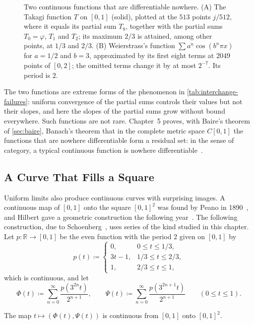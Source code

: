 \begin{figure}
{{\begin{tikzpicture}
\end{tikzpicture}}}{Two continuous functions that are differentiable nowhere. (A) The Takagi function $T$ on $[0,1]$ (solid), plotted at the $513$ points $j/512$, where it equals its partial sum $T_8$, together with the partial sums $T_0=\varphi$, $T_1$ and $T_2$; its maximum $2/3$ is attained, among other points, at $1/3$ and $2/3$. (B) Weierstrass's function $\sum a^n\cos(b^n\pi x)$ for $a=1/2$ and $b=3$, approximated by its first eight terms at $2049$ points of $[0,2]$; the omitted terms change it by at most $2^{-7}$. Its period is $2$.\label{fig:nowhere-differentiable}}
\end{figure}

The two functions are extreme forms of the phenomenon in \cref{tab:interchange-failures}: uniform convergence of the partial sums controls their values but not their slopes, and here the slopes of the partial sums grow without bound everywhere. Such functions are not rare. Chapter~5 proves, with Baire's theorem of \cref{sec:baire}, Banach's theorem that in the complete metric space $C[0,1]$ the functions that are nowhere differentiable form a residual set: in the sense of category, a typical continuous function is nowhere differentiable~\cite{banach1931}.

\subsection{A Curve That Fills a Square}

Uniform limits also produce continuous curves with surprising images. A continuous map of $[0,1]$ onto the square $[0,1]^2$ was found by Peano in 1890~\cite{peano1890curve}, and Hilbert gave a geometric construction the following year~\cite{hilbert1891}. The following construction, due to Schoenberg~\cite{schoenberg1938}, uses series of the kind studied in this chapter. Let $p\colon\mathbb R\to[0,1]$ be the even function with the period $2$ given on $[0,1]$ by
\[
p(t)\coloneqq\begin{cases}0,&0\le t\le1/3,\\3t-1,&1/3\le t\le2/3,\\1,&2/3\le t\le1 ,\end{cases}
\]
which is continuous, and let
\[
\Phi(t)\coloneqq\sum_{n=0}^\infty\frac{p(3^{2n}t)}{2^{n+1}},\qquad\Psi(t)\coloneqq\sum_{n=0}^\infty\frac{p(3^{2n+1}t)}{2^{n+1}}\qquad(0\le t\le1).
\]

\begin{proposition}
\label{prop:space-filling}
The map $t\mapsto(\Phi(t),\Psi(t))$ is continuous from $[0,1]$ onto $[0,1]^2$.
\end{proposition}

